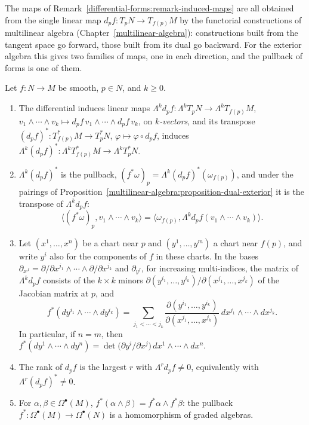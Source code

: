 The maps of Remark~\ref{differential-forms:remark-induced-maps} are all obtained from the single linear map $d_pf \colon T_pN \to T_{f(p)}M$ by the functorial constructions of multilinear
algebra (Chapter~\ref{multilinear-algebra}): constructions built from the tangent space go forward, those built from its dual go backward. For the exterior algebra this gives two families of maps,
one in each direction, and the pullback of forms is one of them.

\begin{proposition}\label{differential-forms:proposition-induced-maps}
Let $f \colon N \to M$ be smooth, $p \in N$, and $k \geq 0$.
\begin{enumerate}
\item The differential induces linear maps $\Lambda^kd_pf \colon \Lambda^kT_pN \to \Lambda^kT_{f(p)}M$, $v_1 \wedge \cdots \wedge v_k \mapsto d_pf\,v_1 \wedge \cdots \wedge d_pf\,v_k$, on
\emph{$k$-vectors}, and its transpose $(d_pf)^* \colon T^*_{f(p)}M \to T^*_pN$, $\varphi \mapsto \varphi \circ d_pf$, induces $\Lambda^k(d_pf)^* \colon \Lambda^kT^*_{f(p)}M \to \Lambda^kT^*_pN$.
\item $\Lambda^k(d_pf)^*$ is the pullback, $(f^*\omega)_p = \Lambda^k(d_pf)^*(\omega_{f(p)})$, and under the pairings of Proposition~\ref{multilinear-algebra:proposition-dual-exterior} it is the
transpose of $\Lambda^kd_pf$:
\[
\langle (f^*\omega)_p, v_1 \wedge \cdots \wedge v_k\rangle = \langle\omega_{f(p)}, \Lambda^kd_pf(v_1 \wedge \cdots \wedge v_k)\rangle .
\]
\item Let $(x^1, \ldots, x^n)$ be a chart near $p$ and $(y^1, \ldots, y^m)$ a chart near $f(p)$, and write $y^i$ also for the components of $f$ in these charts. In the bases
$\partial_{x^J} = \partial/\partial x^{j_1} \wedge \cdots \wedge \partial/\partial x^{j_k}$ and $\partial_{y^I}$, for increasing multi-indices, the matrix of $\Lambda^kd_pf$ consists of the
$k \times k$ minors $\partial(y^{i_1}, \ldots, y^{i_k})/\partial(x^{j_1}, \ldots, x^{j_k})$ of the Jacobian matrix at $p$, and
\[
f^*(dy^{i_1} \wedge \cdots \wedge dy^{i_k}) = \sum_{j_1 < \cdots < j_k}\frac{\partial(y^{i_1}, \ldots, y^{i_k})}{\partial(x^{j_1}, \ldots, x^{j_k})}\,dx^{j_1} \wedge \cdots \wedge dx^{j_k} .
\]
In particular, if $n = m$, then $f^*(dy^1 \wedge \cdots \wedge dy^n) = \det\bigl(\partial y^i/\partial x^j\bigr)\,dx^1 \wedge \cdots \wedge dx^n$.
\item The rank of $d_pf$ is the largest $r$ with $\Lambda^rd_pf \neq 0$, equivalently with $\Lambda^r(d_pf)^* \neq 0$.
\item For $\alpha, \beta \in \Omega^\bullet(M)$, $f^*(\alpha \wedge \beta) = f^*\alpha \wedge f^*\beta$: the pullback $f^* \colon \Omega^\bullet(M) \to \Omega^\bullet(N)$ is a homomorphism of graded algebras.
\end{enumerate}
\end{proposition}

